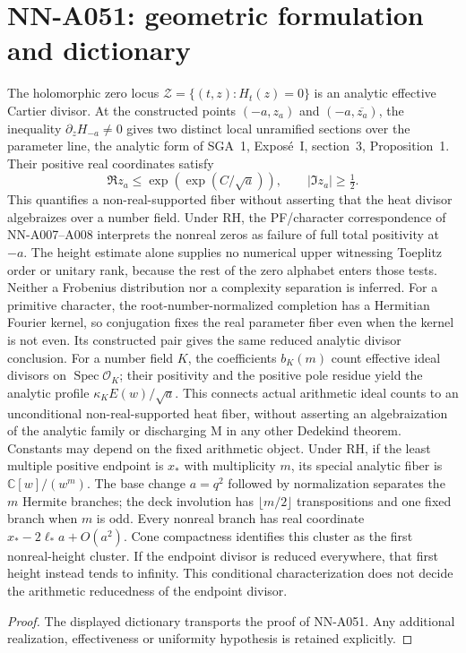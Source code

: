 \section{NN-A051: geometric formulation and dictionary}
\begin{geometricstatement}[NN-A051]
The holomorphic zero locus $\mathcal Z=\{(t,z):H_t(z)=0\}$ is an analytic effective Cartier divisor. At the constructed points $(-a,z_a)$ and $(-a,\overline{z_a})$, the inequality $\partial_zH_{-a}\ne0$ gives two distinct local unramified sections over the parameter line, the analytic form of SGA~1, Expos\'e~I, section~3, Proposition~1. Their positive real coordinates satisfy \[\Re z_a\le\exp\!\left(\exp(C/\sqrt a)\right),\qquad |\Im z_a|\ge\tfrac12.\] This quantifies a non-real-supported fiber without asserting that the heat divisor algebraizes over a number field. Under RH, the PF/character correspondence of NN-A007--A008 interprets the nonreal zeros as failure of full total positivity at $-a$. The height estimate alone supplies no numerical upper witnessing Toeplitz order or unitary rank, because the rest of the zero alphabet enters those tests. Neither a Frobenius distribution nor a complexity separation is inferred. For a primitive character, the root-number-normalized completion has a Hermitian Fourier kernel, so conjugation fixes the real parameter fiber even when the kernel is not even. Its constructed pair gives the same reduced analytic divisor conclusion. For a number field $K$, the coefficients $b_K(m)$ count effective ideal divisors on $\operatorname{Spec}\mathcal O_K$; their positivity and the positive pole residue yield the analytic profile $\kappa_K E(w)/\sqrt a$. This connects actual arithmetic ideal counts to an unconditional non-real-supported heat fiber, without asserting an algebraization of the analytic family or discharging M in any other Dedekind theorem. Constants may depend on the fixed arithmetic object. Under RH, if the least multiple positive endpoint is $x_*$ with multiplicity $m$, its special analytic fiber is $\mathbb C[w]/(w^m)$. The base change $a=q^2$ followed by normalization separates the $m$ Hermite branches; the deck involution has $\lfloor m/2\rfloor$ transpositions and one fixed branch when $m$ is odd. Every nonreal branch has real coordinate $x_*-2\ell_*a+O(a^2)$. Cone compactness identifies this cluster as the first nonreal-height cluster. If the endpoint divisor is reduced everywhere, that first height instead tends to infinity. This conditional characterization does not decide the arithmetic reducedness of the endpoint divisor.
\end{geometricstatement}
\begin{proof} The displayed dictionary transports the proof of NN-A051. Any additional realization, effectiveness or uniformity hypothesis is retained explicitly.\end{proof}


